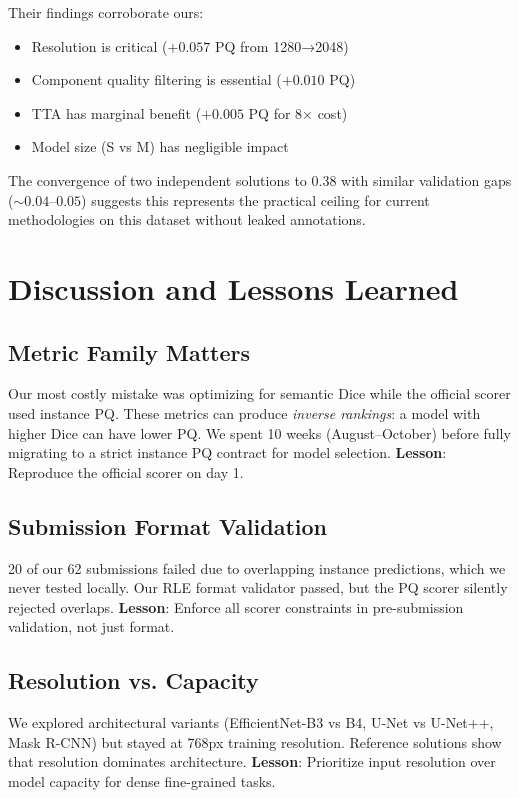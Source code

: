 \documentclass[conference]{IEEEtran}
\begin{document}
Their findings corroborate ours:
\begin{itemize}
    \item Resolution is critical ($+0.057$ PQ from 1280→2048)
    \item Component quality filtering is essential ($+0.010$ PQ)
    \item TTA has marginal benefit ($+0.005$ PQ for 8× cost)
    \item Model size (S vs M) has negligible impact
\end{itemize}

The convergence of two independent solutions to 0.38 with similar validation gaps ($\sim 0.04$--$0.05$) suggests this represents the practical ceiling for current methodologies on this dataset without leaked annotations.

\section{Discussion and Lessons Learned}

\subsection{Metric Family Matters}

Our most costly mistake was optimizing for semantic Dice while the official scorer used instance PQ. These metrics can produce \textit{inverse rankings}: a model with higher Dice can have lower PQ. We spent 10 weeks (August--October) before fully migrating to a strict instance PQ contract for model selection. \textbf{Lesson}: Reproduce the official scorer on day 1.

\subsection{Submission Format Validation}

20 of our 62 submissions failed due to overlapping instance predictions, which we never tested locally. Our RLE format validator passed, but the PQ scorer silently rejected overlaps. \textbf{Lesson}: Enforce all scorer constraints in pre-submission validation, not just format.

\subsection{Resolution vs. Capacity}

We explored architectural variants (EfficientNet-B3 vs B4, U-Net vs U-Net++, Mask R-CNN) but stayed at 768px training resolution. Reference solutions show that resolution dominates architecture. \textbf{Lesson}: Prioritize input resolution over model capacity for dense fine-grained tasks.
\end{document}
